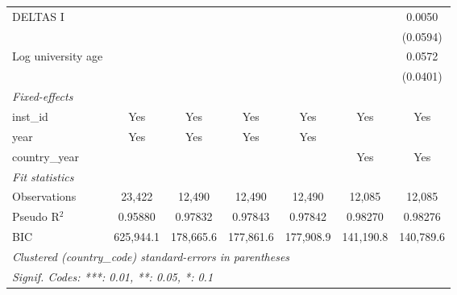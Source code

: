 \begin{tabular}{lcccccc}
   DELTAS I                                &              &                &                &                &                & 0.0050\\   
                                           &              &                &                &                &                & (0.0594)\\   
   Log university age                      &              &                &                &                &                & 0.0572\\   
                                           &              &                &                &                &                & (0.0401)\\   
   \midrule
   \emph{Fixed-effects}\\
   inst\_id                                & Yes          & Yes            & Yes            & Yes            & Yes            & Yes\\  
   year                                    & Yes          & Yes            & Yes            & Yes            &                & \\  
   country\_year                           &              &                &                &                & Yes            & Yes\\  
   \midrule
   \emph{Fit statistics}\\
   Observations                            & 23,422       & 12,490         & 12,490         & 12,490         & 12,085         & 12,085\\  
   Pseudo R$^2$                            & 0.95880      & 0.97832        & 0.97843        & 0.97842        & 0.98270        & 0.98276\\  
   BIC                                     & 625,944.1    & 178,665.6      & 177,861.6      & 177,908.9      & 141,190.8      & 140,789.6\\  
   \midrule \midrule
   \multicolumn{7}{l}{\emph{Clustered (country\_code) standard-errors in parentheses}}\\
   \multicolumn{7}{l}{\emph{Signif. Codes: ***: 0.01, **: 0.05, *: 0.1}}\\
\end{tabular}
\par\endgroup


